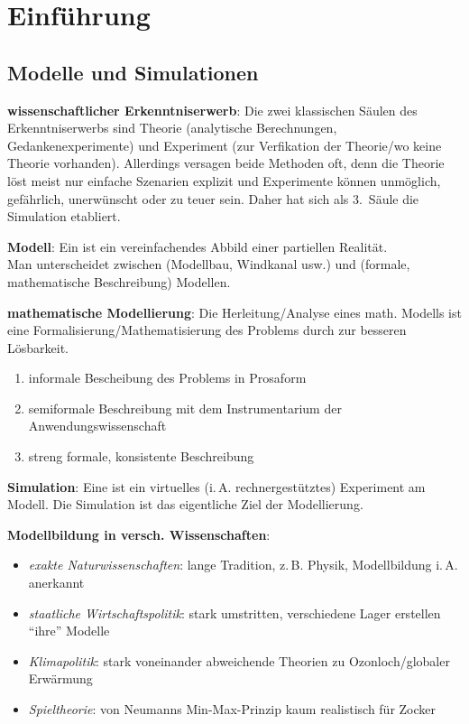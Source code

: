 \chapter{%
    Einführung%
}

\section{%
    Modelle und Simulationen%
}

\textbf{wissenschaftlicher Erkenntniserwerb}:
Die zwei klassischen Säulen des Erkenntniserwerbs sind
Theorie (analytische Berechnungen, Gedankenexperimente) und
Experiment (zur Verfikation der Theorie/wo keine Theorie vorhanden).
Allerdings versagen beide Methoden oft, denn die Theorie löst meist nur einfache
Szenarien explizit und Experimente können unmöglich, gefährlich, unerwünscht oder zu teuer sein.
Daher hat sich als 3.\ Säule die Simulation etabliert.

\linie

\textbf{Modell}:
Ein  ist ein vereinfachendes Abbild einer partiellen Realität.\\
Man unterscheidet zwischen  (Modellbau, Windkanal usw.) und
 (formale, mathematische Beschreibung) Modellen.

\textbf{mathematische Modellierung}:
Die Herleitung/Analyse eines math. Modells ist eine
Formalisierung/Mathematisierung des Problems durch zur besseren Lösbarkeit.
\begin{enumerate}
    \item
    informale Bescheibung des Problems in Prosaform

    \item
    semiformale Beschreibung mit dem Instrumentarium der Anwendungswissenschaft

    \item
    streng formale, konsistente Beschreibung
\end{enumerate}

\linie

\textbf{Simulation}:
Eine  ist ein virtuelles (i.\,A. rechnergestütztes) Experiment am Modell.
Die Simulation ist das eigentliche Ziel der Modellierung.

\textbf{Modellbildung in versch. Wissenschaften}:
\begin{itemize}
    \item
    \emph{exakte Naturwissenschaften}:
    lange Tradition, z.\,B. Physik, Modellbildung i.\,A. anerkannt

    \item
    \emph{staatliche Wirtschaftspolitik}:
    stark umstritten, verschiedene Lager erstellen "`ihre"' Modelle

    \item
    \emph{Klimapolitik}:
    stark voneinander abweichende Theorien zu Ozonloch/globaler Erwärmung

    \item
    \emph{Spieltheorie}:
    von Neumanns Min-Max-Prinzip kaum realistisch für Zocker
\end{itemize}

